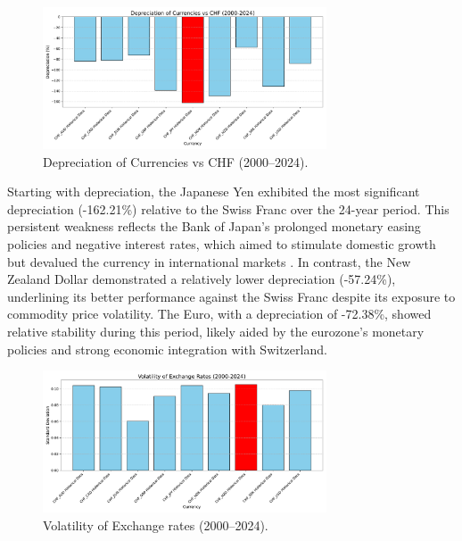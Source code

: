 \documentclass[11pt,a4paper,english,oneside]{book}
\begin{document}
\begin{figure}[h!]
    \centering
    \includegraphics[width=0.75\textwidth]{../../images/depreciation_2000_2024.pdf}
    \caption{Depreciation of Currencies vs CHF (2000--2024).}
    \label{fig:depreciation_2000_2024}
\end{figure}

Starting with depreciation, the Japanese Yen exhibited the most significant depreciation (-162.21\%) relative to the Swiss Franc over the 24-year period. This persistent weakness reflects the Bank of Japan's prolonged monetary easing policies and negative interest rates, which aimed to stimulate domestic growth but devalued the currency in international markets \parencite{shirai2020bank}. In contrast, the New Zealand Dollar demonstrated a relatively lower depreciation (-57.24\%), underlining its better performance against the Swiss Franc despite its exposure to commodity price volatility. The Euro, with a depreciation of -72.38\%, showed relative stability during this period, likely aided by the eurozone's monetary policies and strong economic integration with Switzerland.

\begin{figure}[h!]
    \centering
    \includegraphics[width=0.75\textwidth]{../../images/volatility_2000_2024.pdf}
    \caption{Volatility of Exchange rates (2000--2024).}
    \label{fig:volatility_2000_2024}
\end{figure}
\end{document}
